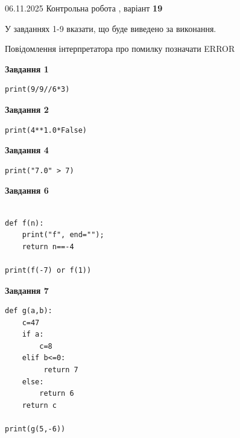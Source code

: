 \documentclass[12pt, ukrainian]{article}
\begin{document}
{\Large{06.11.2025 Контрольна робота , варіант  \No \textbf { 19 }\par}}
{
\begin {large}
У завданнях 1-9 вказати, що буде виведено за виконання.

Повідомлення інтерпретатора про помилку позначати ERROR

\begin{minipage}[t]{7.5cm}

\begin{center}
\textbf{Завдання 1}
\end{center}

\begin{verbatim}
print(9/9//6*3)
\end{verbatim}



\begin{center}
\textbf{Завдання 2}
\end{center}

\begin{verbatim}
print(4**1.0*False)
\end{verbatim}



\begin{center}
\textbf{Завдання 4}
\end{center}

\begin{verbatim}
print("7.0" > 7)
\end{verbatim}



\begin{center}
\textbf{Завдання 6}
\end{center}

\begin{verbatim}

def f(n):
    print("f", end="");
    return n==-4

print(f(-7) or f(1))
\end{verbatim}



\begin{center}
\textbf{Завдання 7}
\end{center}

\begin{verbatim}
def g(a,b):
    c=47
    if a:
        c=8
    elif b<=0:
         return 7
    else: 
        return 6
    return c

print(g(5,-6))
\end{verbatim}


\end{minipage}
\end{large}}
\end{document}
